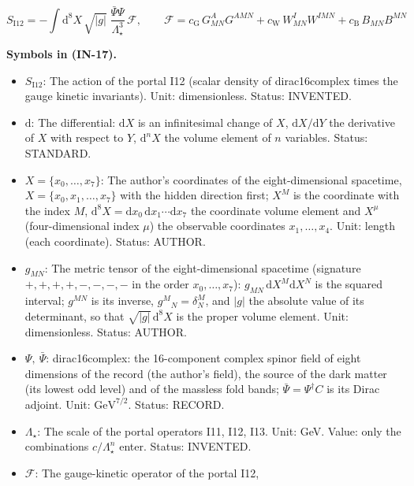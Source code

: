 \documentclass[
  10pt,
]{article}
\providecommand{\tightlist}{%
  \setlength{\itemsep}{0pt}\setlength{\parskip}{0pt}}
\begin{document}
\[
S_{\mathrm{I12}} = -\int\mathrm{d}^8X\,\sqrt{\lvert
 g\rvert}\;\frac{\bar\Psi\Psi}{\Lambda_\star^3}\,\mathcal{F},\qquad
\mathcal{F} = c_{\mathrm{G}}\,G^A_{MN}G^{AMN} + c_{\mathrm{W}}\,W^I_{MN}W^{IMN} +
 c_{\mathrm{B}}\,B_{MN}B^{MN} \tag{IN-17}
\]

\textbf{Symbols in (IN-17).}

\begin{itemize}
\tightlist
\item
  \(S_{\mathrm{I12}}\): The action of the portal I12 (scalar density of
  dirac16complex times the gauge kinetic invariants). Unit:
  dimensionless. Status: INVENTED.
\item
  \(\mathrm{d}\): The differential: \(\mathrm{d}X\) is an infinitesimal
  change of \(X\), \(\mathrm{d}X/\mathrm{d}Y\) the derivative of \(X\)
  with respect to \(Y\), \(\mathrm{d}^nX\) the volume element of \(n\)
  variables. Status: STANDARD.
\item
  \(X = \{x_0, \dots, x_7\}\): The author's coordinates of the
  eight-dimensional spacetime, \(X = \{x_0, x_1, \dots, x_7\}\) with the
  hidden direction first; \(X^M\) is the coordinate with the index
  \(M\),
  \(\mathrm{d}^8X = \mathrm{d}x_0\,\mathrm{d}x_1\cdots\mathrm{d}x_7\)
  the coordinate volume element and \(X^\mu\) (four-dimensional index
  \(\mu\)) the observable coordinates \(x_1, \dots, x_4\). Unit: length
  (each coordinate). Status: AUTHOR.
\item
  \(g_{MN}\): The metric tensor of the eight-dimensional spacetime
  (signature \(+,+,+,+,-,-,-,-\) in the order \(x_0, \dots, x_7\)):
  \(g_{MN}\,\mathrm{d}X^M\mathrm{d}X^N\) is the squared interval;
  \(g^{MN}\) is its inverse, \(g^M{}_N = \delta^M_N\), and
  \(\lvert g\rvert\) the absolute value of its determinant, so that
  \(\sqrt{\lvert g\rvert}\,\mathrm{d}^8X\) is the proper volume element.
  Unit: dimensionless. Status: AUTHOR.
\item
  \(\Psi,\ \bar\Psi\): dirac16complex: the 16-component complex spinor
  field of eight dimensions of the record (the author's field), the
  source of the dark matter (its lowest odd level) and of the massless
  fold bands; \(\bar\Psi = \Psi^\dagger C\) is its Dirac adjoint. Unit:
  \(\mathrm{GeV}^{7/2}\). Status: RECORD.
\item
  \(\Lambda_\star\): The scale of the portal operators I11, I12, I13.
  Unit: GeV. Value: only the combinations \(c/\Lambda_\star^n\) enter.
  Status: INVENTED.
\item
  \(\mathcal{F}\): The gauge-kinetic operator of the portal I12,

\end{itemize}
\end{document}
